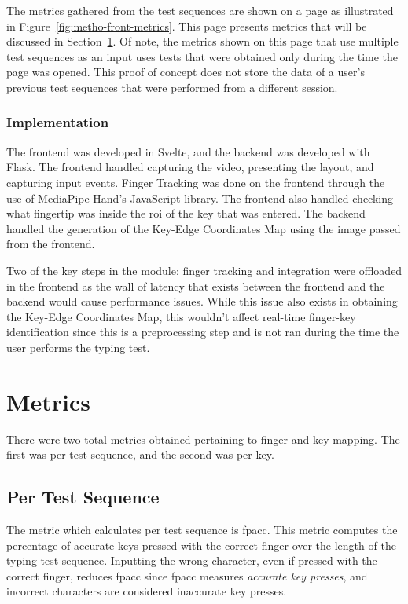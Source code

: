 \documentclass{report}
\begin{document}
The metrics gathered from the test sequences are shown on a page as illustrated
in Figure~\ref{fig:metho-front-metrics}. This page presents metrics that will be
discussed in Section~\ref{section:metric}. Of note, the metrics shown on this
page that use multiple test sequences as an input uses tests that were obtained
only during the time the page was opened. This proof of concept does not store
the data of a user's previous test sequences that were performed from a
different session.

\subsubsection{Implementation}
The frontend was developed in Svelte, and the backend was developed with Flask.
The frontend handled capturing the video, presenting the layout, and capturing
input events. Finger Tracking was done on the frontend through the use of
MediaPipe Hand's JavaScript library. The frontend also handled checking what
fingertip was inside the \ac{roi} of the key that was entered. The backend
handled the generation of the Key-Edge Coordinates Map using the image passed
from the frontend.

Two of the key steps in the module: finger tracking and integration were
offloaded in the frontend as the wall of latency that exists between the
frontend and the backend would cause performance issues. While this issue also
exists in obtaining the Key-Edge Coordinates Map, this wouldn't affect real-time
finger-key identification since this is a preprocessing step and is not ran
during the time the user performs the typing test.

\section{Metrics}
\label{section:metric}

There were two total metrics obtained pertaining to finger and key mapping. The
first was per test sequence, and the second was per key.

\subsection{Per Test Sequence}
The metric which calculates per test sequence is \ac{fpacc}. This metric
computes the percentage of accurate keys pressed with the correct finger over
the length of the typing test sequence. Inputting the wrong character, even if
pressed with the correct finger, reduces \ac{fpacc} since \ac{fpacc} measures
\emph{accurate key presses}, and incorrect characters are considered inaccurate
key presses.
\end{document}
